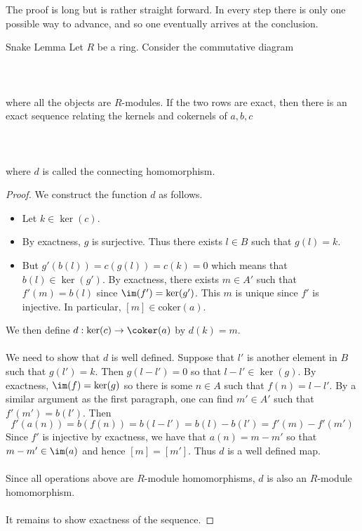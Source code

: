 \documentclass[a4paper]{article}
\begin{document}
The proof is long but is rather straight forward. In every step there is only one possible way to advance, and so one eventually arrives at the conclusion. 

\begin{lmm}{Snake Lemma}{} Let $R$ be a ring. Consider the commutative diagram \\~\\
\\~\\
where all the objects are $R$-modules. If the two rows are exact, then there is an exact sequence relating the kernels and cokernels of $a,b,c$ \\~\\
\\~\\
where $d$ is called the connecting homomorphism. 
\begin{proof}
We construct the function $d$ as follows. 
\begin{itemize}
\item Let $k\in\ker(c)$. 
\item By exactness, $g$ is surjective. Thus there exists $l\in B$ such that $g(l)=k$. 
\item But $g'(b(l))=c(g(l))=c(k)=0$ which means that $b(l)\in\ker(g')$. By exactness, there exists $m\in A'$ such that $f'(m)=b(l)$ since $\im(f')=\ker(g')$. This $m$ is unique since $f'$ is injective. In particular, $[m]\in\text{coker}(a)$. 
\end{itemize}
We then define $d:\ker(c)\to\coker(a)$ by $d(k)=m$. \\~\\

We need to show that $d$ is well defined. Suppose that $l'$ is another element in $B$ such that $g(l')=k$. Then $g(l-l')=0$ so that $l-l'\in\ker(g)$. By exactness, $\im(f)=\ker(g)$ so there is some $n\in A$ such that $f(n)=l-l'$. By a similar argument as the first paragraph, one can find $m'\in A'$ such that $f'(m')=b(l')$. Then $$f'(a(n))=b(f(n))=b(l-l')=b(l)-b(l')=f'(m)-f'(m')$$ Since $f'$ is injective by exactness, we have that $a(n)=m-m'$ so that $m-m'\in\im(a)$ and hence $[m]=[m']$. Thus $d$ is a well defined map. \\~\\

Since all operations above are $R$-module homomorphisms, $d$ is also an $R$-module homomorphism. \\~\\

It remains to show exactness of the sequence. 
\end{proof}
\end{lmm}
\end{document}
